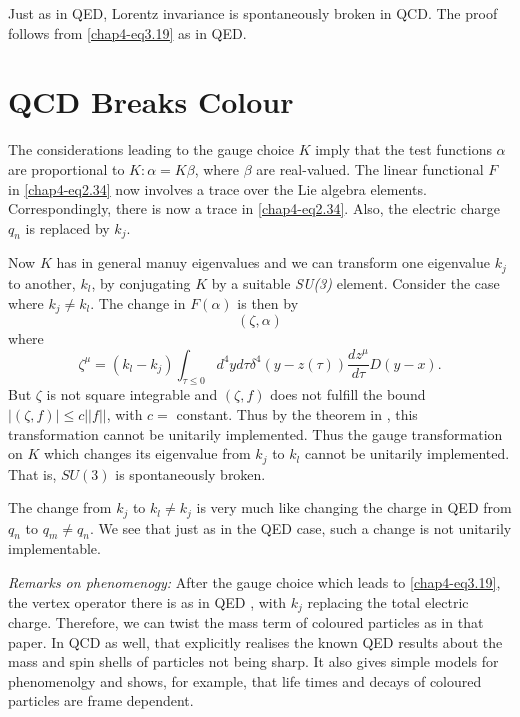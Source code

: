 Just as in QED, Lorentz invariance is spontaneously broken in QCD. The proof follows from \eqref{chap4-eq3.19} as in QED.

\section{QCD Breaks Colour}\label{chap4-sec4}

The considerations leading to the gauge choice $K$ imply that the test functions $\alpha$ are proportional to $K: \alpha = K \beta$, where $\beta$ are real-valued. The linear functional $F$ in \eqref{chap4-eq2.34} now involves a trace over the Lie algebra elements. Correspondingly, there is now a trace in \eqref{chap4-eq2.34}. Also, the electric charge $q_n$ is replaced by $k_j$.

Now $K$ has in general manuy eigenvalues and we can transform one eigenvalue $k_j$ to another, $k_l$, by conjugating $K$ by a suitable \textit{SU(3)} element. Consider the case where $k_j \neq k_l$. The change in $F(\alpha)$ is then by
\begin{equation}
(\zeta, \alpha) \label{chap4-eq4.1}
\end{equation}
where
\begin{equation}
  \zeta^\mu = (k_l - k_j) \int_{\tau \leq 0} d^4 y d\tau \delta^4 (y -z(\tau)) \frac{dz^\mu}{d \tau} D (y-x). \label{chap4-eq4.2}
\end{equation}
But $\zeta$ is not square integrable and $(\zeta, f)$ does not fulfill the bound $|(\zeta, f)|\leq c || f ||$, with $c=$ constant. Thus by the theorem in \cite{chap4-key6}, this transformation cannot be unitarily implemented. Thus the gauge transformation on $K$ which changes its eigenvalue from $k_j$ to $k_l$ cannot be unitarily implemented. That is, $SU(3)$ is spontaneously broken.

The change from $k_j$ to $k_l \neq k_j$ is very much like changing the charge in QED from $q_n$ to $q_m \neq q_n$. We see that just as in the QED case, such a change is not unitarily implementable.

\textit{Remarks on phenomenogy:} After the gauge choice which leads to \eqref{chap4-eq3.19}, the vertex operator there is as in QED \cite{chap4-key4}, with $k_j$ replacing the total electric charge. Therefore, we can twist the mass term of coloured particles as in that paper. In QCD as well, that explicitly realises the known QED results \cite{chap4-key2, chap4-key3} about the mass and spin shells of particles not being sharp. It also gives simple models for phenomenolgy and shows, for example, that life times and decays of coloured particles are frame dependent.

